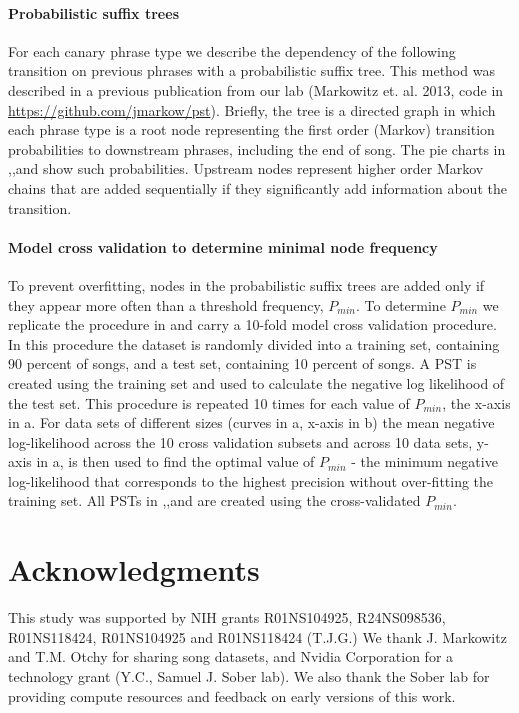 \documentclass[9pt,lineno]{elife}
\begin{document}
\paragraph{Probabilistic suffix trees}
For each canary phrase type we describe the dependency of the following transition on previous phrases with a probabilistic suffix tree. This method was described in a previous publication from our lab (Markowitz et. al. 2013, code in \url{https://github.com/jmarkow/pst}). Briefly, the tree is a directed graph in which each phrase type is a root node representing the first order (Markov) transition probabilities to downstream phrases, including the end of song. The pie charts in ,,and  show such probabilities. Upstream nodes represent higher order Markov chains that are added sequentially if they significantly add information about the transition.

\paragraph{Model cross validation to determine minimal node frequency}
To prevent overfitting, nodes in the probabilistic suffix trees are added only if they appear more often than a threshold frequency, $P_{min}$. To determine $P_{min}$ we replicate the procedure in \citep{markowitz_long-range_2013} and carry a 10-fold model cross validation procedure. In this procedure the dataset is randomly divided into a training set, containing 90 percent of songs, and a test set, containing 10 percent of songs. A PST is created using the training set and used to calculate the negative log likelihood of the test set. This procedure is repeated 10 times for each value of $P_{min}$, the x-axis in a. For data sets of different sizes (curves in a, x-axis in b) the mean negative log-likelihood across the 10 cross validation subsets and across 10 data sets, y-axis in a, is then used to find the optimal value of $P_{min}$ - the minimum negative log-likelihood that corresponds to the highest precision without over-fitting the training set. All PSTs in ,,and  are created using the cross-validated $P_{min}$.

\section{Acknowledgments}
This study was supported by NIH grants R01NS104925,
R24NS098536, R01NS118424, R01NS104925 and R01NS118424 (T.J.G.) We thank J. Markowitz and T.M. Otchy for sharing song datasets, and Nvidia Corporation for a technology grant (Y.C., Samuel J. Sober lab).
We also thank the Sober lab for providing 
compute resources and feedback on early versions of this work.



\nolinenumbers
\end{document}
